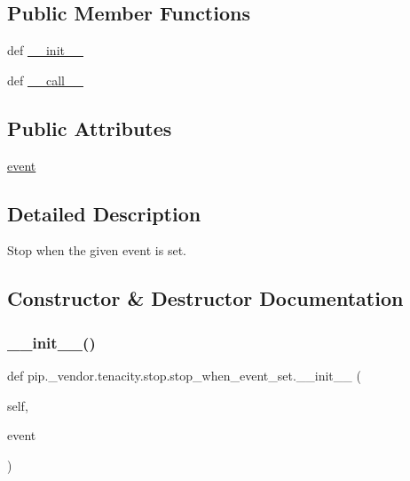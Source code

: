 \subsection*{Public Member Functions}
\begin{DoxyCompactItemize}
\item 
def \hyperlink{classpip_1_1__vendor_1_1tenacity_1_1stop_1_1stop__when__event__set_ace2a4685ba4a2763b6b736a581f442fe}{\+\_\+\+\_\+init\+\_\+\+\_\+}
\item 
def \hyperlink{classpip_1_1__vendor_1_1tenacity_1_1stop_1_1stop__when__event__set_a2a3fa91b37debdecc5f2fac3b8b924c6}{\+\_\+\+\_\+call\+\_\+\+\_\+}
\end{DoxyCompactItemize}
\subsection*{Public Attributes}
\begin{DoxyCompactItemize}
\item 
\hyperlink{classpip_1_1__vendor_1_1tenacity_1_1stop_1_1stop__when__event__set_a9edb6f69087c35a44383b09eb7af640f}{event}
\end{DoxyCompactItemize}


\subsection{Detailed Description}
\begin{DoxyVerb}Stop when the given event is set.\end{DoxyVerb}
 

\subsection{Constructor \& Destructor Documentation}
\mbox{\label{classpip_1_1__vendor_1_1tenacity_1_1stop_1_1stop__when__event__set_ace2a4685ba4a2763b6b736a581f442fe}} 
\subsubsection{\texorpdfstring{\+\_\+\+\_\+init\+\_\+\+\_\+()}{\_\_init\_\_()}}
{\footnotesize\ttfamily def pip.\+\_\+vendor.\+tenacity.\+stop.\+stop\+\_\+when\+\_\+event\+\_\+set.\+\_\+\+\_\+init\+\_\+\+\_\+ (\begin{DoxyParamCaption}\item[{}]{self,  }\item[{}]{event }\end{DoxyParamCaption})}




